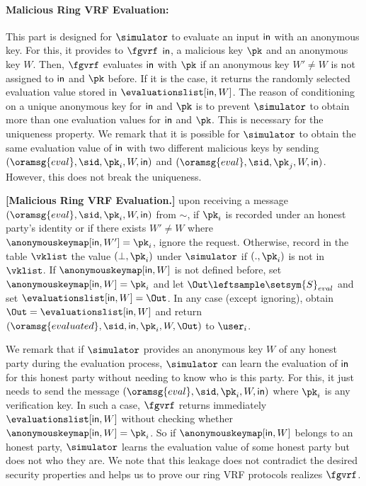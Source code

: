 \paragraph{Malicious Ring VRF Evaluation:} This part is designed for $ \simulator $ to evaluate an input $ \mathsf{in} $ with an anonymous key. For this,  it  provides to $ \fgvrf $  $ \mathsf{in} $, a malicious key $ \pk $ and an anonymous key $ W $.  Then, $ \fgvrf $ evaluates  $ \mathsf{in} $ with $ \pk $ if an anonymous key $ W' \neq W$  is not assigned to $ \mathsf{in} $ and $ \pk $ before.  If it is the case, it returns the randomly selected evaluation value stored  in $ \evaluationslist[\msg, W] $. The reason of conditioning on a unique anonymous key for $ \mathsf{in} $ and $ \pk $ is to prevent $ \simulator $ to obtain more than one evaluation values for $ \mathsf{in} $ and $ \pk $. This is necessary for the uniqueness property.
We remark that it is possible  for $ \simulator $ to  obtain the same evaluation value of $ \mathsf{in} $ with two different malicious  keys  by sending $ (\oramsg{eval}, \sid, \pk_i, W, \msg) $ and $(\oramsg{eval}, \sid, \pk_j, W, \msg)$. However, this does not break the uniqueness.

\begin{tcolorbox}[left=2pt,right=2pt]
	\eprint{}{\small}
	\textbf{[Malicious Ring VRF Evaluation.]}  upon receiving a message $(\oramsg{eval}, \sid, \pk_i, W, \msg)$ from $\sim$, if $ \pk_i $ is recorded under an honest party's identity or if there exists $ W'\neq W $ where $ \anonymouskeymap[\msg,W'] = \pk_i $, ignore the request.
	Otherwise, record in the table $\vklist$ the value $(\perp,\pk_i)$ under $\simulator$ if $ (.,\pk_i) $ is not in $ \vklist $.
	If  $\anonymouskeymap[\msg,W]  $ is not defined before, set $ \anonymouskeymap[\msg,W] = \pk_i $ and let   $\Out \leftsample \setsym{S}_{eval}$ and set $ \evaluationslist[\msg, W] = \Out$.
	In any case (except ignoring), obtain $ \Out = \evaluationslist[\msg, W] $ and return $(\oramsg{evaluated}, \sid,  \msg, \pk_i,W, \Out)$ to $ \user_i $.
\end{tcolorbox}

We remark that if $ \simulator $ provides an anonymous key $ W $ of any honest party during  the evaluation process,  $ \simulator $ can learn the  evaluation of  $ \mathsf{in} $ for this honest party without needing to know who is this party. For this, it just needs to send the message $ (\oramsg{eval}, \sid, \pk_i,W,\msg) $ where $ \pk_i $ is any  verification key. In such a case, $ \fgvrf $  returns immediately $ \evaluationslist[\msg, W] $ without checking whether $ \anonymouskeymap[\msg,W] = \pk_i $. So if   $ \anonymouskeymap[\msg,W]  $ belongs to an honest party, $ \simulator $ learns the evaluation value of some honest party but does not who they are. We note that this leakage does not contradict the desired security properties and helps us to prove our ring VRF protocols realizes $ \fgvrf $.  

